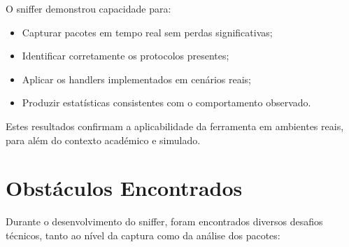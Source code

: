 \documentclass[a4paper,12pt]{article}
\begin{document}
O sniffer demonstrou capacidade para:

\begin{itemize}
    \item Capturar pacotes em tempo real sem perdas significativas;
    \item Identificar corretamente os protocolos presentes;
    \item Aplicar os handlers implementados em cenários reais;
    \item Produzir estatísticas consistentes com o comportamento observado.
\end{itemize}

Estes resultados confirmam a aplicabilidade da ferramenta em ambientes reais, para além do contexto académico e simulado.

\section{Obstáculos Encontrados}

Durante o desenvolvimento do sniffer, foram encontrados diversos desafios técnicos, tanto ao nível da captura como da análise dos pacotes:
\end{document}
